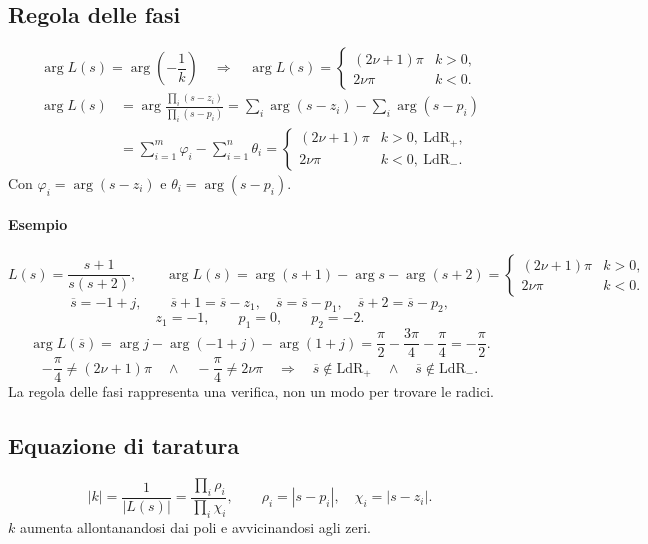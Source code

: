 \subsection*{Regola delle fasi}
\[
\arg L(s)=\arg\left(-\frac1k\right)
\quad\Longrightarrow\quad
\arg L(s)=\begin{cases}(2\nu+1)\pi&k>0,\\2\nu\pi&k<0.\end{cases}
\]
\begin{align*}
\arg L(s)&=\arg\frac{\prod_i(s-z_i)}{\prod_i(s-p_i)}
=\sum_i\arg(s-z_i)-\sum_i\arg(s-p_i)\\
&=\sum_{i=1}^{m}\varphi_i-\sum_{i=1}^{n}\theta_i
=\begin{cases}(2\nu+1)\pi&k>0,\ \mathrm{LdR}_+,\\
2\nu\pi&k<0,\ \mathrm{LdR}_-.\end{cases}
\end{align*}
Con $\varphi_i=\arg(s-z_i)$ e $\theta_i=\arg(s-p_i)$.
\paragraph{Esempio}
\[
L(s)=\frac{s+1}{s(s+2)},\qquad
\arg L(s)=\arg(s+1)-\arg s-\arg(s+2)
=\begin{cases}(2\nu+1)\pi&k>0,\\2\nu\pi&k<0.\end{cases}
\]
\[
\overline s=-1+j,\qquad
\overline s+1=\overline s-z_1,\quad
\overline s=\overline s-p_1,\quad
\overline s+2=\overline s-p_2,
\]
\[
z_1=-1,\qquad p_1=0,\qquad p_2=-2.
\]
\[
\arg L(\overline s)=\arg j-\arg(-1+j)-\arg(1+j)
=\frac\pi2-\frac{3\pi}4-\frac\pi4=-\frac\pi2.
\]
\[
-\frac\pi4\ne(2\nu+1)\pi\quad\land\quad-\frac\pi4\ne2\nu\pi
\quad\Longrightarrow\quad
\overline s\notin\mathrm{LdR}_+\quad\land\quad\overline s\notin\mathrm{LdR}_-.
\]
La regola delle fasi rappresenta una verifica, non un modo per trovare le radici.
\subsection*{Equazione di taratura}
\[
|k|=\frac1{|L(s)|}=\frac{\prod_i\rho_i}{\prod_i\chi_i},
\qquad\rho_i=|s-p_i|,\quad\chi_i=|s-z_i|.
\]
$k$ aumenta allontanandosi dai poli e avvicinandosi agli zeri.
